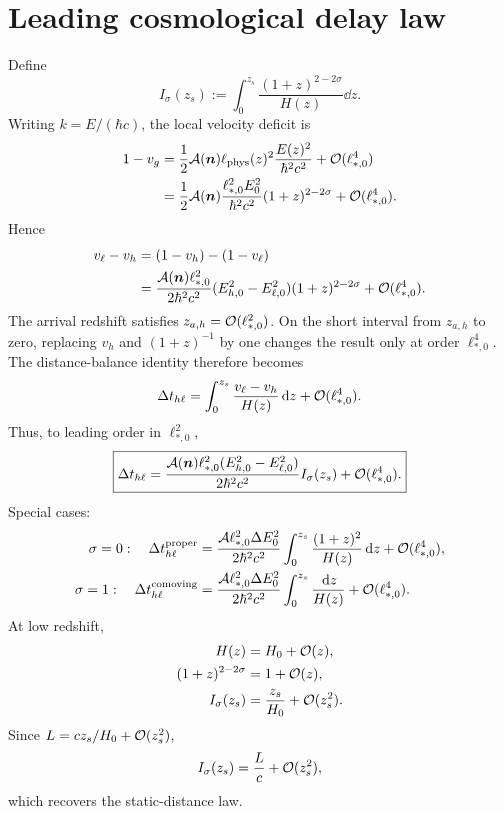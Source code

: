 \section{Leading cosmological delay law}
Define
\begin{equation}
I_\sigma(z_s)
:=\int_0^{z_s}
\frac{(1+z)^{2-2\sigma}}{H(z)}\dd z.
\end{equation}
Writing \(k=E/(\hbar c)\), the local velocity deficit is
\begin{align}
1-v_g
&=\frac12\mathcal A(\bm n)
\ell_{\mathrm{phys}}(z)^2
\frac{E(z)^2}{\hbar^2c^2}
+\mathcal O(\ell_{*,0}^4)\\
&=\frac12\mathcal A(\bm n)
\frac{\ell_{*,0}^2E_0^2}{\hbar^2c^2}
(1+z)^{2-2\sigma}
+\mathcal O(\ell_{*,0}^4).
\end{align}
Hence
\begin{align}
v_\ell-v_h
&=(1-v_h)-(1-v_\ell)\\
&=\frac{\mathcal A(\bm n)\ell_{*,0}^2}
{2\hbar^2c^2}
(E_{h,0}^2-E_{\ell,0}^2)
(1+z)^{2-2\sigma}
+\mathcal O(\ell_{*,0}^4).
\end{align}
The arrival redshift satisfies \(z_{a,h}=\mathcal O(\ell_{*,0}^2)\).  On the short interval from \(z_{a,h}\) to zero, replacing \(v_h\) and \((1+z)^{-1}\) by one changes the result only at order \(\ell_{*,0}^4\).  The distance-balance identity therefore becomes
\begin{equation}
\Delta t_{h\ell}
=\int_0^{z_s}\frac{v_\ell-v_h}{H(z)}\,\mathrm d z
+\mathcal O(\ell_{*,0}^4).
\end{equation}
Thus, to leading order in \(\ell_{*,0}^2\),
\begin{equation}
\boxed{
\Delta t_{h\ell}
=
\frac{
\mathcal A(\bm n)\ell_{*,0}^2
(E_{h,0}^2-E_{\ell,0}^2)
}{2\hbar^2c^2}
I_\sigma(z_s)
+\mathcal O(\ell_{*,0}^4).
}
\end{equation}
Special cases:
\begin{align}
\sigma=0:
\quad
\Delta t_{h\ell}^{\mathrm{proper}}
&=
\frac{
\mathcal A\ell_{*,0}^2\Delta E_0^2
}{2\hbar^2c^2}
\int_0^{z_s}\frac{(1+z)^2}{H(z)}\,\mathrm d z
+\mathcal O(\ell_{*,0}^4),\\
\sigma=1:
\quad
\Delta t_{h\ell}^{\mathrm{comoving}}
&=
\frac{
\mathcal A\ell_{*,0}^2\Delta E_0^2
}{2\hbar^2c^2}
\int_0^{z_s}\frac{\,\mathrm d z}{H(z)}
+\mathcal O(\ell_{*,0}^4).
\end{align}
At low redshift,
\begin{align}
H(z)&=H_0+\mathcal O(z),\\
(1+z)^{2-2\sigma}&=1+\mathcal O(z),\\
I_\sigma(z_s)&=\frac{z_s}{H_0}+\mathcal O(z_s^2).
\end{align}
Since \(L=cz_s/H_0+\mathcal O(z_s^2)\),
\begin{equation}
I_\sigma(z_s)
=\frac{L}{c}+\mathcal O(z_s^2),
\end{equation}
which recovers the static-distance law.

